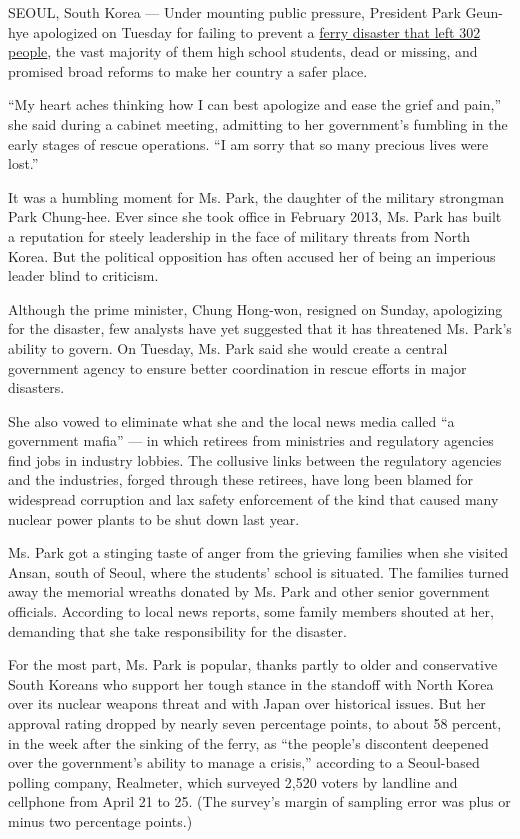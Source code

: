 SEOUL, South Korea --- Under mounting public pressure, President Park
Geun-hye apologized on Tuesday for failing to prevent a
\href{http://www.nytimes3xbfgragh.onion/2014/04/17/world/asia/south-korean-ferry-accident.html}{ferry
disaster that left 302 people}, the vast majority of them high school
students, dead or missing, and promised broad reforms to make her
country a safer place.

``My heart aches thinking how I can best apologize and ease the grief
and pain,'' she said during a cabinet meeting, admitting to her
government's fumbling in the early stages of rescue operations. ``I am
sorry that so many precious lives were lost.''

It was a humbling moment for Ms. Park, the daughter of the military
strongman Park Chung-hee. Ever since she took office in February 2013,
Ms. Park has built a reputation for steely leadership in the face of
military threats from North Korea. But the political opposition has
often accused her of being an imperious leader blind to criticism.

Although the prime minister, Chung Hong-won, resigned on Sunday,
apologizing for the disaster, few analysts have yet suggested that it
has threatened Ms. Park's ability to govern. On Tuesday, Ms. Park said
she would create a central government agency to ensure better
coordination in rescue efforts in major disasters.

She also vowed to eliminate what she and the local news media called ``a
government mafia'' --- in which retirees from ministries and regulatory
agencies find jobs in industry lobbies. The collusive links between the
regulatory agencies and the industries, forged through these retirees,
have long been blamed for widespread corruption and lax safety
enforcement of the kind that caused many nuclear power plants to be shut
down last year.

Ms. Park got a stinging taste of anger from the grieving families when
she visited Ansan, south of Seoul, where the students' school is
situated. The families turned away the memorial wreaths donated by Ms.
Park and other senior government officials. According to local news
reports, some family members shouted at her, demanding that she take
responsibility for the disaster.

For the most part, Ms. Park is popular, thanks partly to older and
conservative South Koreans who support her tough stance in the standoff
with North Korea over its nuclear weapons threat and with Japan over
historical issues. But her approval rating dropped by nearly seven
percentage points, to about 58 percent, in the week after the sinking of
the ferry, as ``the people's discontent deepened over the government's
ability to manage a crisis,'' according to a Seoul-based polling
company, Realmeter, which surveyed 2,520 voters by landline and
cellphone from April 21 to 25. (The survey's margin of sampling error
was plus or minus two percentage points.)

